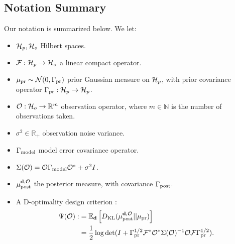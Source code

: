 \subsection{Notation Summary}\label{subsec:notation}
  Our notation is summarized below. We let:
  \begin{itemize}
  \item $\mathcal{H}_p, \mathcal{H}_o$ Hilbert spaces.
  \item $\mathcal{F}:\mathcal{H}_p \to \mathcal{H}_o$ a linear compact operator.
  \item $\mu_{\textup{pr}} \sim \mathcal{N}(0, \Gamma_{\textup{pr}})$ prior Gaussian measure on
    $\mathcal{H}_p$, with prior covariance operator $\Gamma_{\textup{pr}}:\mathcal{H}_p \to \mathcal{H}_p$.
  \item $\mathcal{O}: \mathcal{H}_o \to \mathbb{R}^m$ observation operator, where $m
    \in \mathbb{N}$ is the number of observations taken. 
  \item $\sigma^2 \in \mathbb{R}_{+}$ observation noise variance.
  \item $\Gamma_{\textup{model}}$ model error covariance operator.
  \item $\Sigma(\mathcal{O}) = \mathcal{O} \Gamma_{\textup{model}} \mathcal{O}^* + \sigma^2I$. 
  \item $\mu_{\textup{post}}^{\mathbf{d}, \mathcal{O}}$ the posterior measure, with covariance $\Gamma_{\textup{post}}$.
  \item A D-optimality design criterion
    \cite{AlexanderianGloorGhattas14}:
    \begin{align*}
      \begin{split}
        \tar(\obs) :&= \mathbb{E}_{\data}\left [ D_{\text{KL}} (\post || \pr ) \right ] \\
        &= \frac12 \log \det ( I + \prcov^{1/2} \fwd ^* \obs^* \Sigma(\obs)^{-1} \obs
        \fwd \prcov^{1/2}).
      \end{split}
    \end{align*}
  \end{itemize}



